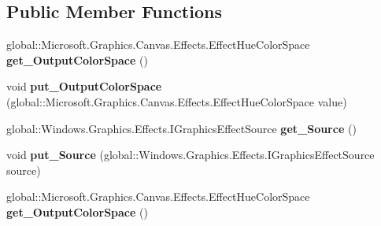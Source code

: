 \subsection*{Public Member Functions}
\begin{DoxyCompactItemize}
\item 
\mbox{\label{interface_microsoft_1_1_graphics_1_1_canvas_1_1_effects_1_1_i_rgb_to_hue_effect_a53da861c46cdef87c6cdd66a1baf9798}} 
global\+::\+Microsoft.\+Graphics.\+Canvas.\+Effects.\+Effect\+Hue\+Color\+Space {\bfseries get\+\_\+\+Output\+Color\+Space} ()
\item 
\mbox{\label{interface_microsoft_1_1_graphics_1_1_canvas_1_1_effects_1_1_i_rgb_to_hue_effect_ad8679afd320843650369bba783e11405}} 
void {\bfseries put\+\_\+\+Output\+Color\+Space} (global\+::\+Microsoft.\+Graphics.\+Canvas.\+Effects.\+Effect\+Hue\+Color\+Space value)
\item 
\mbox{\label{interface_microsoft_1_1_graphics_1_1_canvas_1_1_effects_1_1_i_rgb_to_hue_effect_a84ea69b21839d230f7b651c8ff534060}} 
global\+::\+Windows.\+Graphics.\+Effects.\+I\+Graphics\+Effect\+Source {\bfseries get\+\_\+\+Source} ()
\item 
\mbox{\label{interface_microsoft_1_1_graphics_1_1_canvas_1_1_effects_1_1_i_rgb_to_hue_effect_a97e678d785f29e1d365bec9a84fc3940}} 
void {\bfseries put\+\_\+\+Source} (global\+::\+Windows.\+Graphics.\+Effects.\+I\+Graphics\+Effect\+Source source)
\item 
\mbox{\label{interface_microsoft_1_1_graphics_1_1_canvas_1_1_effects_1_1_i_rgb_to_hue_effect_a53da861c46cdef87c6cdd66a1baf9798}} 
global\+::\+Microsoft.\+Graphics.\+Canvas.\+Effects.\+Effect\+Hue\+Color\+Space {\bfseries get\+\_\+\+Output\+Color\+Space} ()
\item 
\mbox{\label{interface_microsoft_1_1_graphics_1_1_canvas_1_1_effects_1_1_i_rgb_to_hue_effect_ad8679afd320843650369bba783e11405}} 

\end{DoxyCompactItemize}
